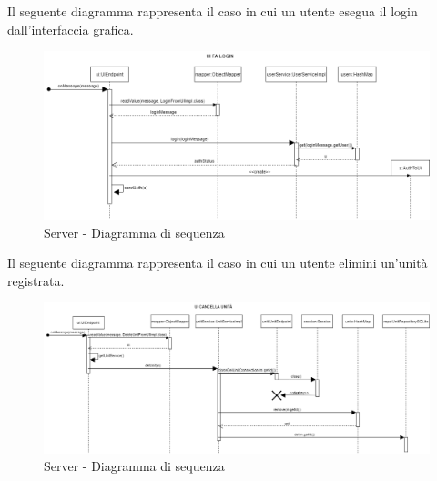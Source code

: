 \newpage
Il seguente diagramma rappresenta il caso in cui un utente esegua il login dall'interfaccia grafica.
\begin{figure}[H]
	\centering
	\includegraphics[width=13cm]{img/server_seq2.png}
	\caption{Server - Diagramma di sequenza}
\end{figure}

Il seguente diagramma rappresenta il caso in cui un utente elimini un'unità registrata.
\begin{figure}[H]
	\centering
	\includegraphics[width=13cm]{img/server_seq3.png}
	\caption{Server - Diagramma di sequenza}
\end{figure}